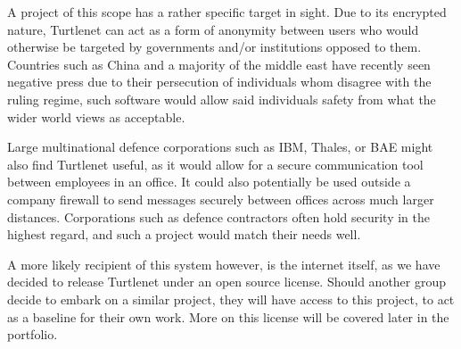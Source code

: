 A project of this scope has a rather specific target in sight. Due to its 
encrypted nature, Turtlenet can act as a form of anonymity between users who 
would otherwise be targeted by governments and/or institutions opposed to 
them. Countries such as China and a majority of the middle east have recently 
seen negative press due to their persecution of individuals whom disagree with
the ruling regime, such software would allow said individuals safety from what
the wider world views as acceptable. 

Large multinational defence corporations such as IBM, Thales, or BAE might also 
find Turtlenet useful, as it would allow for a secure communication tool 
between employees in an office. It could also potentially be used outside a 
company firewall to send messages securely between offices across much larger 
distances. Corporations such as defence contractors often hold security in the 
highest regard, and such a project would match their needs well.

A more likely recipient of this system however, is the internet itself, as we
have decided to release Turtlenet under an open source license. Should another 
group decide to embark on a similar project, they will have access to this 
project, to act as a baseline for their own work. More on this license will be 
covered later in the portfolio.
